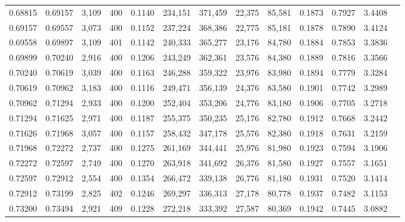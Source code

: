 \begin{tabular}{rrrrrrrrrrrrr}
0.68815 & 0.69157 & 3,109 & 400 &                                     0.1140 & 234,151 & 371,459 &  22,375 &  85,581 & 0.1873 & 0.7927 & 3.4408 \\
0.69157 & 0.69557 & 3,073 & 400 &                                     0.1152 & 237,224 & 368,386 &  22,775 &  85,181 & 0.1878 & 0.7890 & 3.4124 \\
0.69558 & 0.69897 & 3,109 & 401 &                                     0.1142 & 240,333 & 365,277 &  23,176 &  84,780 & 0.1884 & 0.7853 & 3.3836 \\
0.69899 & 0.70240 & 2,916 & 400 &                                     0.1206 & 243,249 & 362,361 &  23,576 &  84,380 & 0.1889 & 0.7816 & 3.3566 \\
0.70240 & 0.70619 & 3,039 & 400 &                                     0.1163 & 246,288 & 359,322 &  23,976 &  83,980 & 0.1894 & 0.7779 & 3.3284 \\
0.70619 & 0.70962 & 3,183 & 400 &                                     0.1116 & 249,471 & 356,139 &  24,376 &  83,580 & 0.1901 & 0.7742 & 3.2989 \\
0.70962 & 0.71294 & 2,933 & 400 &                                     0.1200 & 252,404 & 353,206 &  24,776 &  83,180 & 0.1906 & 0.7705 & 3.2718 \\
0.71294 & 0.71625 & 2,971 & 400 &                                     0.1187 & 255,375 & 350,235 &  25,176 &  82,780 & 0.1912 & 0.7668 & 3.2442 \\
0.71626 & 0.71968 & 3,057 & 400 &                                     0.1157 & 258,432 & 347,178 &  25,576 &  82,380 & 0.1918 & 0.7631 & 3.2159 \\
0.71968 & 0.72272 & 2,737 & 400 &                                     0.1275 & 261,169 & 344,441 &  25,976 &  81,980 & 0.1923 & 0.7594 & 3.1906 \\
0.72272 & 0.72597 & 2,749 & 400 &                                     0.1270 & 263,918 & 341,692 &  26,376 &  81,580 & 0.1927 & 0.7557 & 3.1651 \\
0.72597 & 0.72912 & 2,554 & 400 &                                     0.1354 & 266,472 & 339,138 &  26,776 &  81,180 & 0.1931 & 0.7520 & 3.1414 \\
0.72912 & 0.73199 & 2,825 & 402 &                                     0.1246 & 269,297 & 336,313 &  27,178 &  80,778 & 0.1937 & 0.7482 & 3.1153 \\
0.73200 & 0.73494 & 2,921 & 409 &                                     0.1228 & 272,218 & 333,392 &  27,587 &  80,369 & 0.1942 & 0.7445 & 3.0882 \\

\end{tabular}
